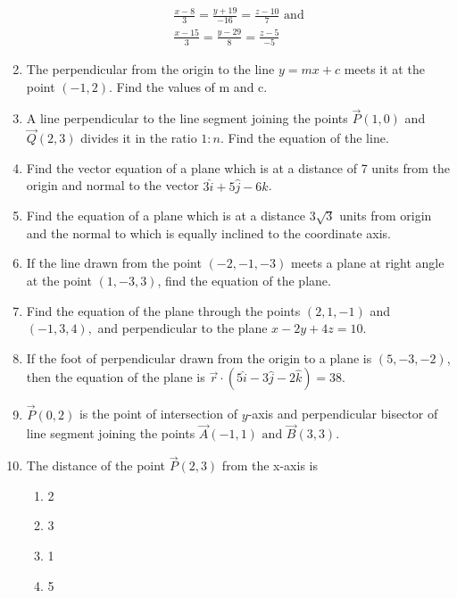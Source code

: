 \begin{enumerate}[label=\thesubsection.\arabic*,ref=\thesubsection.\theenumi]
\begin{align}
	\frac{x-8}{3}=\frac{y+19}{-16}=\frac{z-10}{7} \text{ and }\\ \frac{x-15}{3}=\frac{y-29}{8}=\frac{z-5}{-5} 
\end{align}
    \solution
		
 \item The perpendicular from the origin to the line $y=mx+c$ meets it at the point $(-1,2)$. Find the values of m and c.
 \label{11.10.3.15}
	 \\
 \solution
 
\item 
A line perpendicular to the line segment joining the points $\vec{P}(1,0)$ and $\vec{Q}(2,3)$ divides it in the ratio $1:n$. Find the equation of the line.
	\\
	\solution 
\label{chapters/11/10/2/11}

\item Find the vector equation of a plane which is at a distance of 7 units from the origin and normal to the vector $3\hat{i}+5\hat{j}-6\hat{k}$.
	\\
    \solution
		
\item Find the equation of a plane which is at a distance 3$\sqrt{3}$ units from origin and the normal to which is equally inclined to the coordinate axis.
\item If the line drawn from the point $(-2,-1,-3)$ meets a plane at right angle at the point $(1,-3,3)$, find the equation of the plane.
\item Find the equation of the plane through the points $(2,1,-1)$ and $(-1,3,4),$ and 
perpendicular to the plane $x-2y+4z=10.$
\item If the foot of perpendicular drawn from the origin to a plane is $(5,-3,-2)$, then the equation of the plane is $\overrightarrow{r} \cdot (5\hat{i}-3\hat{j}-2\hat{k})=38.$
\item  $\vec{P}(0,2)$ is the point of intersection of $y$-axis and perpendicular bisector of line segment joining the points $\vec{A}(-1,1) \text{ and } \vec{B}(3,3)$.
	\item The distance of the point $\vec{P}(2, 3)$ from the x-axis is

\begin{enumerate}
\item 2
\item 3
\item 1
\item 5 
\end{enumerate}


\end{enumerate}
